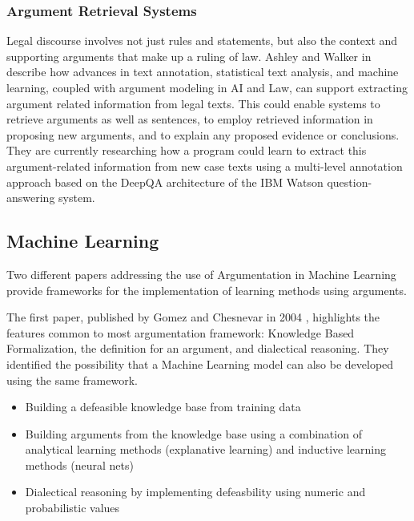 \documentclass[sigconf]{acmart}
\begin{document}
\subsubsection{Argument Retrieval Systems} Legal discourse involves not just rules and statements, but also the context and supporting arguments that make up a ruling of law. Ashley and Walker in \cite{ashley2013information} describe how advances in text annotation, statistical text analysis, and machine learning, coupled with argument modeling in AI and Law, can support extracting argument related information from legal texts. This could enable systems to retrieve arguments as
well as sentences, to employ retrieved information in proposing new arguments, and to
explain any proposed evidence or conclusions. They are currently researching how a program
could learn to extract this argument-related information from new case texts using a
multi-level annotation approach based on the DeepQA architecture of the IBM Watson
question-answering system.

\subsection{Machine Learning}
Two different papers addressing the use of Argumentation in Machine Learning provide frameworks for the implementation of learning methods using arguments.

The first paper, published by Gomez and Chesnevar in 2004 \cite{defeasibleML}, highlights the features common to most argumentation framework: Knowledge Based Formalization, the definition for an argument, and dialectical reasoning. They identified the possibility that a Machine Learning model can also be developed using the same framework. 

\begin{itemize}
  \item Building a defeasible knowledge base from training data
  \item Building arguments from the knowledge base using a combination of analytical learning methods (explanative learning) and inductive learning methods (neural nets)
  \item Dialectical reasoning by implementing defeasbility using numeric and probabilistic values
\end{itemize}
\end{document}
